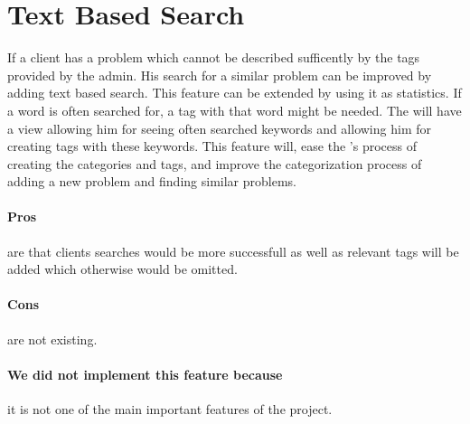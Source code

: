 \section{Text Based Search}
\label{sec:text_based_search}
If a client has a problem which cannot be described sufficently by the tags provided by the admin. 
His search for a similar problem can be improved by adding text based search. 
This feature can be extended by using it as statistics. If a word is often searched for, a tag with that word might be needed. 
The \admin[] will have a view allowing him for seeing often searched keywords and allowing him for creating tags with these keywords.
This feature will, ease the \admin[]'s process of creating the categories and tags, and improve the categorization process of adding a new problem and finding similar problems.

\paragraph{Pros} are that clients searches would be more successfull as well as relevant tags will be added which otherwise would be omitted.
\paragraph{Cons} are not existing.
\paragraph{We did not implement this feature because} it is not one of the main important features of the project. 
